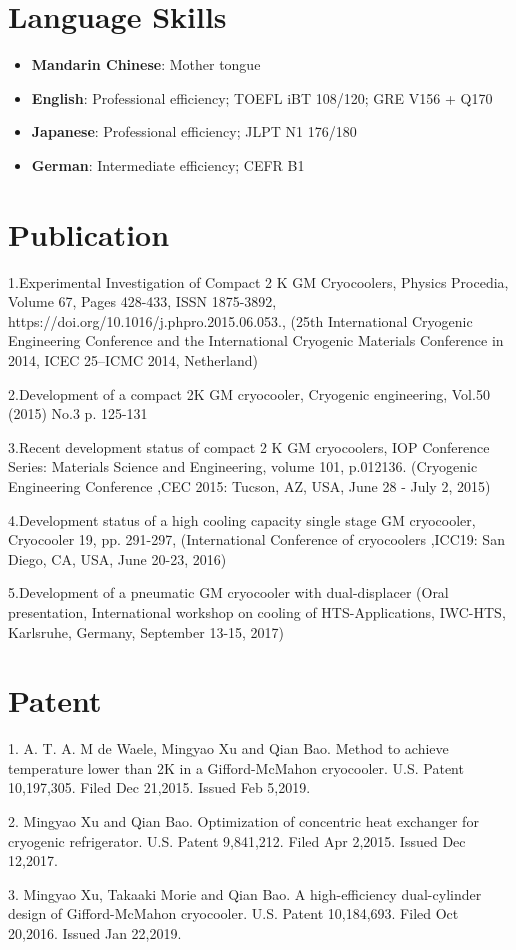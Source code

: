\documentclass[letterpaper,11pt]{article}
\newcommand{\resumeItem}[2]{
  \item\small{
    \textbf{#1}{: #2 \vspace{-2pt}}
  }
}
\newcommand{\resumeSubItem}[2]{\resumeItem{#1}{#2}\vspace{-4pt}}
\newcommand{\resumeSubHeadingListStart}{\begin{itemize}[leftmargin=*]}
\newcommand{\resumeSubHeadingListEnd}{\end{itemize}}
\begin{document}
\section{Language Skills}
\resumeSubHeadingListStart
  \resumeSubItem{Mandarin Chinese}{Mother tongue}
  \resumeSubItem{English}{Professional efficiency; TOEFL iBT 108/120; GRE V156 + Q170}
  \resumeSubItem{Japanese}{Professional efficiency; JLPT N1 176/180}
  \resumeSubItem{German}{Intermediate efficiency; CEFR B1}
\resumeSubHeadingListEnd


\section{Publication}
1.Experimental Investigation of Compact 2 K GM Cryocoolers, Physics Procedia, Volume 67, Pages 428-433, ISSN 1875-3892,
https://doi.org/10.1016/j.phpro.2015.06.053., (25th International Cryogenic Engineering Conference and the International Cryogenic Materials Conference in 2014, ICEC 25–ICMC 2014, Netherland)

2.Development of a compact 2K GM cryocooler, Cryogenic engineering, Vol.50 (2015) No.3 p. 125-131

3.Recent development status of compact 2 K GM cryocoolers,
IOP Conference Series: Materials Science and Engineering,
volume 101,
p.012136.
(Cryogenic Engineering Conference ,CEC 2015: Tucson, AZ, USA, June 28 - July 2, 2015)

4.Development status of a high cooling capacity single stage GM cryocooler,
Cryocooler 19,
pp. 291-297,
(International Conference of cryocoolers ,ICC19: San Diego, CA, USA, June 20-23, 2016)

5.Development of a pneumatic GM cryocooler with dual-displacer (Oral presentation, International workshop on cooling of HTS-Applications, IWC-HTS, Karlsruhe, Germany, September 13-15, 2017)

\section{Patent}
1. A. T. A. M de Waele, Mingyao Xu and Qian Bao. Method to achieve temperature lower than 2K in a Gifford-McMahon cryocooler. U.S. Patent 10,197,305. Filed Dec 21,2015. Issued Feb 5,2019.   

2. Mingyao Xu and Qian Bao. Optimization of concentric heat exchanger for cryogenic refrigerator. U.S. Patent 9,841,212. Filed Apr 2,2015. Issued Dec 12,2017.   

3. Mingyao Xu, Takaaki Morie and Qian Bao. A high-efficiency dual-cylinder design of Gifford-McMahon cryocooler. U.S. Patent 10,184,693. Filed Oct 20,2016. Issued Jan 22,2019.   
\end{document}
